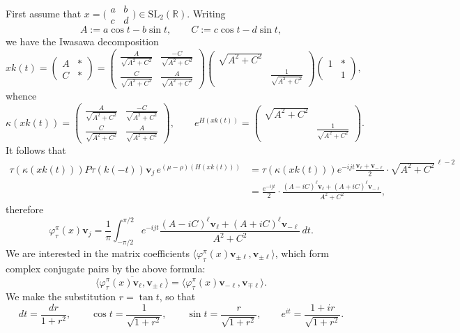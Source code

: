 \documentclass[11pt,oneside]{amsart}
\numberwithin{equation}{section}
\theoremstyle{remark}
\theoremstyle{plain}
\newcommand\SL{\mathrm{SL}}
\newcommand\RR{\mathbb{R}}
\newcommand{\bv}{\mathbf{v}}
\newcommand\ov{\overline}
\begin{document}
First assume that $x=\bigl(\begin{smallmatrix} a & b \\ c & d \end{smallmatrix}\bigr)\in\SL_2(\RR)$. Writing
\[A:=a\cos t - b\sin t,\qquad C:=c\cos t - d\sin t,\]
we have the Iwasawa decomposition
\[xk(t)=\begin{pmatrix}A&\ast\\C&\ast\end{pmatrix}=
\begin{pmatrix} \frac{A}{\sqrt{A^2+C^2}} & \frac{-C}{\sqrt{A^2+C^2}} \\ \frac{C}{\sqrt{A^2+C^2}} & \frac{A}{\sqrt{A^2+C^2}} \end{pmatrix}\begin{pmatrix}\scriptstyle\sqrt{A^2+C^2}&\\&\frac{1}{\sqrt{A^2+C^2}}\end{pmatrix}
\begin{pmatrix} 1 & \ast \\ & 1 \end{pmatrix},\]
whence
\[\kappa(xk(t))=\begin{pmatrix} \frac{A}{\sqrt{A^2+C^2}} & \frac{-C}{\sqrt{A^2+C^2}} \\ \frac{C}{\sqrt{A^2+C^2}} & \frac{A}{\sqrt{A^2+C^2}} \end{pmatrix} ,\qquad e^{H(xk(t))}=\begin{pmatrix}\scriptstyle\sqrt{A^2+C^2}&\\&\frac{1}{\sqrt{A^2+C^2}}\end{pmatrix}.\]
It follows that
\begin{align*}
\tau(\kappa(xk(t)))P\tau(k(-t))\bv_j\,e^{(\mu-\rho)(H(xk(t)))}
&=\tau(\kappa(xk(t)))e^{-ijt}\frac{\bv_\ell+\bv_{-\ell}}{2}\cdot\sqrt{A^2+C^2}^{\,\ell-2}\\
&=\frac{e^{-ijt}}{2}\cdot\frac{(A-iC)^\ell \bv_\ell+(A+iC)^\ell \bv_{-\ell}}{A^2+C^2},
\end{align*}
therefore
\[\varphi_\tau^\pi(x)\bv_j=\frac{1}{\pi}\int_{-\pi/2}^{\pi/2}
e^{-ijt}\frac{(A-iC)^\ell \bv_\ell+(A+iC)^\ell \bv_{-\ell}}{A^2+C^2}\,dt.\]
We are interested in the matrix coefficients $\langle\varphi_\tau^\pi(x)\bv_{\pm\ell},\bv_{\pm\ell}\rangle$, which form complex conjugate pairs by the above formula:
\[\ov{\langle\varphi_\tau^\pi(x)\bv_\ell,\bv_{\pm\ell}\rangle}=\langle\varphi_\tau^\pi(x)\bv_{-\ell},\bv_{\mp\ell}\rangle.\]
We make the substitution $r=\tan t$, so that
\[dt=\frac{dr}{1+r^2},\qquad \cos t=\frac{1}{\sqrt{1+r^2}},\qquad \sin t=\frac{r}{\sqrt{1+r^2}}
,\qquad e^{it}=\frac{1+ir}{\sqrt{1+r^2}}.\]
\end{document}
